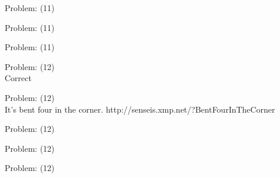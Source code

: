 \documentclass[11pt]{article}
\begin{document}
\begin{minipage}[t]{0.5\textwidth}
  {\centering
  
Problem: (11)\\
  }
\end{minipage}
\begin{minipage}[t]{0.5\textwidth}
  {\centering
  
Problem: (11)\\
  }
\end{minipage}
\begin{minipage}[t]{0.5\textwidth}
  {\centering
  
Problem: (11)\\
  }
\end{minipage}
\begin{minipage}[t]{0.5\textwidth}
  {\centering
  
Problem: (12)\\
Correct\\
  }
\end{minipage}
\begin{minipage}[t]{0.5\textwidth}
  {\centering
  
Problem: (12)\\
It's bent four in the corner. http://senseis.xmp.net/?BentFourInTheCorner\\
  }
\end{minipage}
\begin{minipage}[t]{0.5\textwidth}
  {\centering
  
Problem: (12)\\
  }
\end{minipage}
\begin{minipage}[t]{0.5\textwidth}
  {\centering
  
Problem: (12)\\
  }
\end{minipage}
\begin{minipage}[t]{0.5\textwidth}
  {\centering
  
Problem: (12)\\
  }
\end{minipage}
\end{document}
